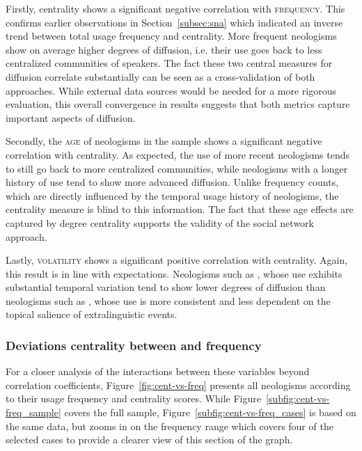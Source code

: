 \documentclass[
  a4paper,
  abstract=on,
  captions=tableabove
  ]{scrartcl}
\begin{document}
      Firstly, centrality shows a significant negative correlation with \textsc{frequency}. This confirms earlier observations in Section~\ref{subsec:sna} which indicated an inverse trend between total usage frequency and centrality. More frequent neologisms show on average higher degrees of diffusion, i.e. their use goes back to less centralized communities of speakers. The fact these two central measures for diffusion correlate substantially can be seen as a cross-validation of both approaches. While external data sources would be needed for a more rigorous evaluation, this overall convergence in results suggests that both metrics capture important aspects of diffusion.

      Secondly, the \textsc{age} of neologisms in the sample shows a significant negative correlation with centrality. As expected, the use of more recent neologisms tends to still go back to more centralized communities, while neologisms with a longer history of use tend to show more advanced diffusion. Unlike frequency counts, which are directly influenced by the temporal usage history of neologisms, the centrality measure is blind to this information. The fact that these age effects are captured by degree centrality supports the validity of the social network approach.

      Lastly, \textsc{volatility} shows a significant positive correlation with centrality. Again, this result is in line with expectations. Neologisms such as , whose use exhibits substantial temporal variation tend to show lower degrees of diffusion than neologisms such as , whose use is more consistent and less dependent on the topical salience of extralinguistic events.

    \subsubsection{Deviations centrality between and frequency}

      For a closer analysis of the interactions between these variables beyond correlation coefficients, Figure~\ref{fig:cent-vs-freq} presents all neologisms according to their usage frequency and centrality scores. While Figure~\ref{subfig:cent-vs-freq_sample} covers the full sample, Figure~\ref{subfig:cent-vs-freq_cases} is based on the same data, but zooms in on the frequency range which covers four of the selected cases to provide a clearer view of this section of the graph.
\end{document}
